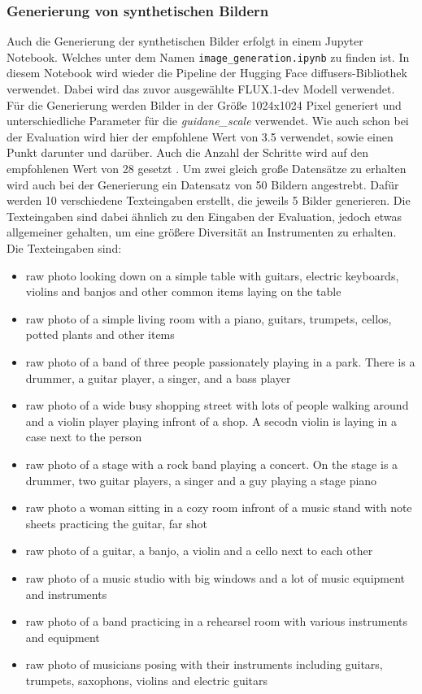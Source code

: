 \subsubsection{Generierung von synthetischen Bildern}
Auch die Generierung der synthetischen Bilder erfolgt in einem Jupyter Notebook. Welches unter dem Namen \texttt{image\_generation.ipynb} zu finden ist. In diesem Notebook wird wieder die Pipeline der Hugging Face diffusers-Bibliothek verwendet. Dabei wird das zuvor ausgewählte FLUX.1-dev Modell verwendet.
Für die Generierung werden Bilder in der Größe 1024x1024 Pixel generiert und unterschiedliche Parameter für die \emph{guidane\_scale} verwendet. Wie auch schon bei der Evaluation wird hier der empfohlene Wert von 3.5 verwendet, sowie einen Punkt darunter und darüber. Auch die Anzahl der Schritte wird auf den empfohlenen Wert von 28 gesetzt \cite{hf-flux}.
Um zwei gleich große Datensätze zu erhalten wird auch bei der Generierung ein Datensatz von 50 Bildern angestrebt. Dafür werden 10 verschiedene Texteingaben erstellt, die jeweils 5 Bilder generieren. Die Texteingaben sind dabei ähnlich zu den Eingaben der Evaluation, jedoch etwas allgemeiner gehalten, um eine größere Diversität an Instrumenten zu erhalten. Die Texteingaben sind:
\begin{itemize}
    \item raw photo looking down on a simple table with guitars, electric keyboards, violins and banjos and other common items laying on the table
    \item raw photo of a simple living room with a piano, guitars, trumpets, cellos, potted plants and other items
    \item raw photo of a band of three people passionately playing in a park. There is a drummer, a guitar player, a singer, and a bass player
    \item raw photo of a wide busy shopping street with lots of people walking around and a violin player playing infront of a shop. A secodn violin is laying in a case next to the person
    \item raw photo of a stage with a rock band playing a concert. On the stage is a drummer, two guitar players, a singer and a guy playing a stage piano
    \item raw photo a woman sitting in a cozy room infront of a music stand with note sheets practicing the guitar, far shot
    \item raw photo of a guitar, a banjo, a violin and a cello next to each other
    \item raw photo of a music studio with big windows and a lot of music equipment and instruments
    \item raw photo of a band practicing in a rehearsel room with various instruments and equipment
    \item raw photo of musicians posing with their instruments including guitars, trumpets, saxophons, violins and electric guitars
\end{itemize}
